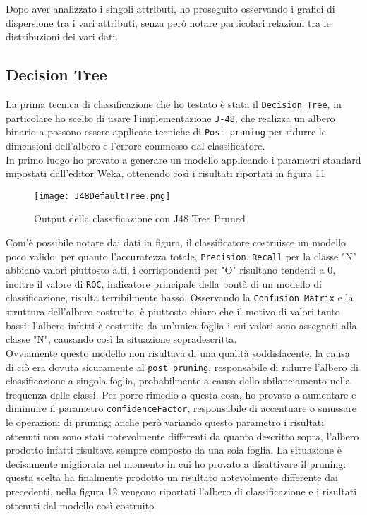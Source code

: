 Dopo aver analizzato i singoli attributi, ho proseguito osservando i grafici di dispersione tra i vari attributi, senza però notare particolari relazioni tra le distribuzioni dei vari dati.

  
  
  \subsection{Decision Tree}
  La prima tecnica di classificazione che ho testato è stata il \texttt{Decision Tree}, in particolare ho scelto di usare l'implementazione \texttt{J-48}, che realizza un albero binario a possono essere applicate tecniche di \texttt{Post pruning} per ridurre le dimensioni dell'albero e l'errore commesso dal classificatore.\\
  In primo luogo ho provato a generare un modello applicando i parametri standard impostati dall'editor Weka, ottenendo così i risultati riportati in figura 11
  
  \begin{figure}[H]
  	\texttt{[image: J48DefaultTree.png]}
  	\caption{Output della classificazione con J48 Tree Pruned}
  \end{figure}

Com'è possibile notare dai dati in figura, il classificatore costruisce un modello poco valido: per quanto l'accuratezza totale, \texttt{Precision}, \texttt{Recall} per la classe "N" abbiano valori piuttosto alti, i corrispondenti per "O" risultano tendenti a 0, inoltre il valore di \texttt{ROC}, indicatore principale della bontà di un modello di classificazione, risulta terribilmente basso. Osservando la \texttt{Confusion Matrix} e la struttura dell'albero costruito, è piuttosto chiaro che il motivo di valori tanto bassi: l'albero infatti è costruito da un'unica foglia i cui valori sono assegnati alla classe "N", causando così la situazione sopradescritta.\\
Ovviamente questo modello non risultava di una qualità soddisfacente, la causa di ciò era dovuta sicuramente al \texttt{post pruning}, responsabile di ridurre l'albero di classificazione a singola foglia,  probabilmente a causa dello sbilanciamento nella frequenza delle classi.
Per porre rimedio a questa cosa, ho provato a aumentare e diminuire il parametro \texttt{confidenceFactor}, responsabile di accentuare o smussare le operazioni di pruning; anche però variando questo parametro i risultati ottenuti non sono stati notevolmente differenti da quanto descritto sopra, l'albero prodotto infatti risultava sempre composto da una sola foglia.
La situazione è decisamente migliorata nel momento in cui ho provato a disattivare il pruning: questa scelta ha finalmente prodotto un risultato notevolmente differente dai precedenti, nella figura 12  vengono riportati l'albero di classificazione e i risultati ottenuti dal modello così costruito

